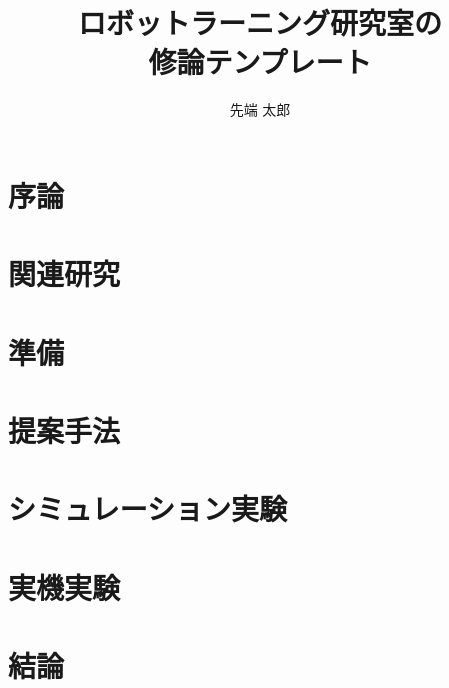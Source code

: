\documentclass[12pt,dvipdfmx]{jarticle}
\title{ロボットラーニング研究室の\\修論テンプレート}
\author{先端 太郎}
\begin{document}
\titlepage
\cmemberspage


\firstabstract
\secondabstract

\toc
\newpage
\listoffigures
\listoftables
\newpage
{}

\section{序論} \label{sec: intro}

\newpage
\section{関連研究} \label{sec: rel_work}

\newpage
\section{準備} \label{sec: prelim}

\newpage
\section{提案手法} \label{sec: proposal}

\newpage
\section{シミュレーション実験} \label{sec: sim_exp}

\newpage
\section{実機実験} \label{sec: real_exp}

\newpage
\section{結論} \label{sec: concl}

\newpage
\acknowledgements

\newpage




\appendix

\end{document}
